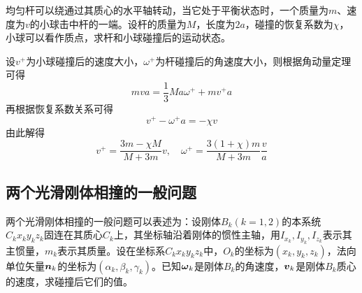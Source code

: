 \begin{example}
均匀杆可以绕通过其质心的水平轴转动，当它处于平衡状态时，一个质量为$m$、速度为$v$的小球击中杆的一端。设杆的质量为$M$，长度为$2a$，碰撞的恢复系数为$\chi$，小球可以看作质点，求杆和小球碰撞后的运动状态。
\end{example}
\begin{solution}
设$v^+$为小球碰撞后的速度大小，$\omega^+$为杆碰撞后的角速度大小，则根据角动量定理可得
\begin{equation*}
	mva = \dfrac13Ma\omega^++mv^+a
\end{equation*}
再根据恢复系数关系可得
\begin{equation*}
	v^+-\omega^+a=-\chi v
\end{equation*}
由此解得
\begin{equation*}
	v^+ = \frac{3m-\chi M}{M+3m}v,\quad \omega^+ = \frac{3(1+\chi)m}{M+3m}\frac{v}{a}
\end{equation*}
\end{solution}

\subsection{两个光滑刚体相撞的一般问题}

两个光滑刚体相撞的一般问题可以表述为：设刚体$B_k(k=1,2)$的本系统$C_kx_ky_kz_k$固连在其质心$C_k$上，其坐标轴沿着刚体的惯性主轴，用$I_{x_k},I_{y_k},I_{z_k}$表示其主惯量，$m_k$表示其质量。设在坐标系$C_kx_ky_kz_k$中，$O_k$的坐标为$(x_k,y_k,z_k)$，法向单位矢量$\boldsymbol{n}_k$的坐标为$(\alpha_k,\beta_k,\gamma_k)$。已知$\boldsymbol{\omega}_k$是刚体$B_k$的角速度，$\boldsymbol{v}_k$是刚体$B_k$质心的速度，求碰撞后它们的值。

